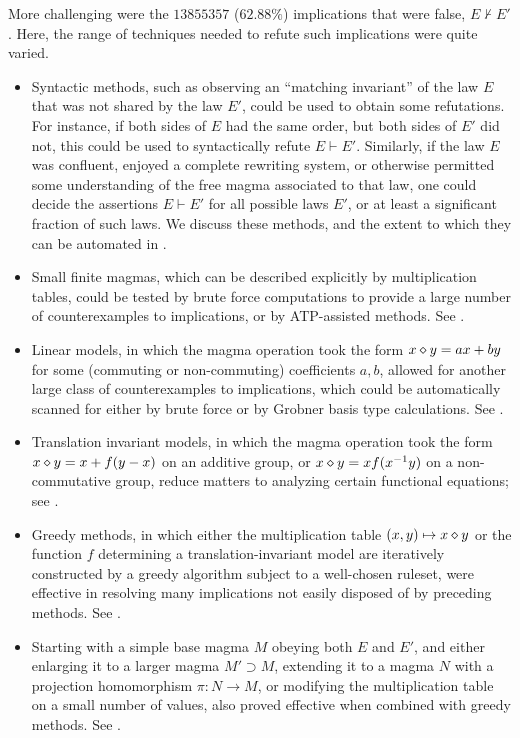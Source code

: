 More challenging were the $13855357$ ($62.88\%$) implications that were false, $E \not \vdash E'$. Here, the range of techniques needed to refute such implications were quite varied.
\begin{itemize}
        \item Syntactic methods, such as observing an ``matching invariant'' of the law $E$ that was not shared by the law $E'$, could be used to obtain some refutations.  For instance, if both sides of $E$ had the same order, but both sides of $E'$ did not, this could be used to syntactically refute $E \vdash E'$.  Similarly, if the law $E$ was confluent, enjoyed a complete rewriting system, or otherwise permitted some understanding of the free magma associated to that law, one could decide the assertions $E \vdash E'$ for all possible laws $E'$, or at least a significant fraction of such laws.  We discuss these methods, and the extent to which they can be automated in .
        \item Small finite magmas, which can be described explicitly by multiplication tables, could be tested by brute force computations to provide a large number of counterexamples to implications, or by ATP-assisted methods. See .
        \item Linear models, in which the magma operation took the form $x \diamond y = ax + by$ for some (commuting or non-commuting) coefficients $a,b$, allowed for another large class of counterexamples to implications, which could be automatically scanned for either by brute force or by Grobner basis type calculations. See .
        \item Translation invariant models, in which the magma operation took the form $x \diamond y = x + f(y-x)$ on an additive group, or $x \diamond y = x f(x^{-1} y)$ on a non-commutative group, reduce matters to analyzing certain functional equations; see .
        \item Greedy methods, in which either the multiplication table $(x,y) \mapsto x \diamond y$ or the function $f$ determining a translation-invariant model are iteratively constructed by a greedy algorithm subject to a well-chosen ruleset, were effective in resolving many implications not easily disposed of by preceding methods. See .
        \item Starting with a simple base magma $M$ obeying both $E$ and $E'$, and either enlarging it to a larger magma $M' \supset M$, extending it to a magma $N$ with a projection homomorphism $\pi: N \to M$, or modifying the multiplication table on a small number of values, also proved effective when combined with greedy methods. See .

\end{itemize}
